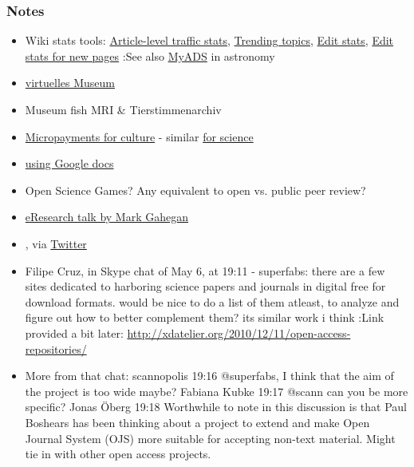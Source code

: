 \documentclass[final,authoryear,3p]{elsarticle-open-drafting}
\begin{document}
\begin{enumerate}
\subsubsection{Notes}
\begin{itemize}
	\item Wiki stats tools: \href{http://stats.grok.se/en/201101/Magnetic resonance imaging}{Article-level traffic stats}, \href{http://www.trendingtopics.org/page/Magnetic_resonance_imaging}{Trending topics}, \href{http://www.wikirage.com/}{Edit stats}, \href{http://unit1.conus.info:8080/en.wikipedia.stats/}{Edit stats for new pages}
:See also \href{http://adsabs.harvard.edu/myADS/cache/278851069_PRE.html}{MyADS} in astronomy
	\item \href{http://de.guttenplag.wikia.com/wiki/Benutzer_Blog:Mr._Nice/Quo_vadis,_GuttenPlag}{virtuelles Museum}
	\item Museum fish MRI \& Tierstimmenarchiv
	\item \href{http://ff.im/CCtKf}{Micropayments for culture}  - similar \href{http://friendfeed.com/open-science-summit-2010/a3a7a6ca/sciflies-microfinancing-for-science}{for science}
	\item \href{http://chronicle.com/blogs/profhacker/using-google-docs-forms-to-run-a-peer-review-writing-workshop/33107}{using Google docs}
	\item Open Science Games? Any equivalent to open vs. public peer review?
	\item \href{http://friendfeed.com/kubke/ae9078a8/rt-bestgrid-6pm-tonight-streaming-live}{eResearch talk by Mark Gahegan}
	\item \href{http://museumgam.es/ Museum metadata games}, via \href{http://twitter.com/mia_out}{Twitter}
	\item Filipe Cruz, in Skype chat of May 6, at 19:11 - superfabs: there are a few sites dedicated to harboring science papers and journals in digital free for download formats. would be nice to do a list of them atleast, to analyze and figure out how to better complement them? its similar work i think
:Link provided a bit later: \href{http://xdatelier.org/2010/12/11/open-access-repositories/}{http://xdatelier.org/2010/12/11/open-access-repositories/}
	\item More from that chat: 
scannopolis 19:16 
@superfabs, I think that the aim of the project is too wide maybe?
Fabiana Kubke 19:17 
@scann can you be more specific?
Jonas {\"O}berg 19:18 
Worthwhile to note in this discussion is that Paul Boshears has been thinking about a project to extend and make Open Journal System (OJS) more suitable for accepting non-text material. Might tie in with other open access projects.

\end{itemize}
\end{enumerate}
\end{document}

